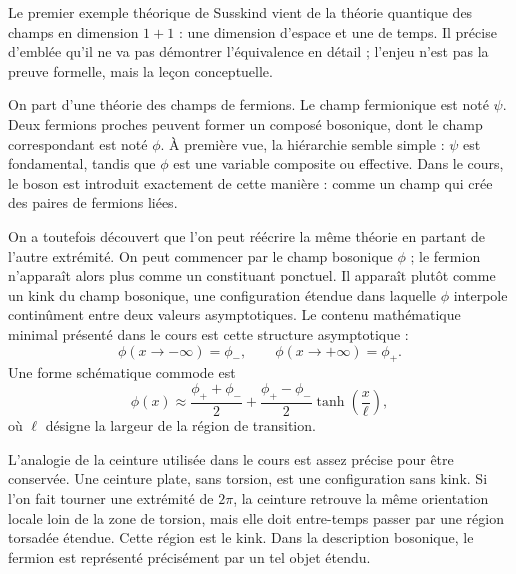 Le premier exemple théorique de Susskind vient de la théorie quantique des champs en dimension \(1+1\) : une dimension d’espace et une de temps. Il précise d’emblée qu’il ne va pas démontrer l’équivalence en détail ; l’enjeu n’est pas la preuve formelle, mais la leçon conceptuelle.

On part d’une théorie des champs de fermions. Le champ fermionique est noté \(\psi\). Deux fermions proches peuvent former un composé bosonique, dont le champ correspondant est noté \(\phi\). À première vue, la hiérarchie semble simple : \(\psi\) est fondamental, tandis que \(\phi\) est une variable composite ou effective. Dans le cours, le boson est introduit exactement de cette manière : comme un champ qui crée des paires de fermions liées.

On a toutefois découvert que l’on peut réécrire la même théorie en partant de l’autre extrémité. On peut commencer par le champ bosonique \(\phi\) ; le fermion n’apparaît alors plus comme un constituant ponctuel. Il apparaît plutôt comme un kink du champ bosonique, une configuration étendue dans laquelle \(\phi\) interpole continûment entre deux valeurs asymptotiques. Le contenu mathématique minimal présenté dans le cours est cette structure asymptotique :
\begin{equation}
\phi(x\to -\infty)=\phi_-,
\qquad
\phi(x\to +\infty)=\phi_+.
\end{equation}
Une forme schématique commode est
\begin{equation}
\phi(x)\approx \frac{\phi_++\phi_-}{2}
+
\frac{\phi_+-\phi_-}{2}\tanh\!\left(\frac{x}{\ell}\right),
\end{equation}
où \(\ell\) désigne la largeur de la région de transition.


L’analogie de la ceinture utilisée dans le cours est assez précise pour être conservée. Une ceinture plate, sans torsion, est une configuration sans kink. Si l’on fait tourner une extrémité de \(2\pi\), la ceinture retrouve la même orientation locale loin de la zone de torsion, mais elle doit entre-temps passer par une région torsadée étendue. Cette région est le kink. Dans la description bosonique, le fermion est représenté précisément par un tel objet étendu.

